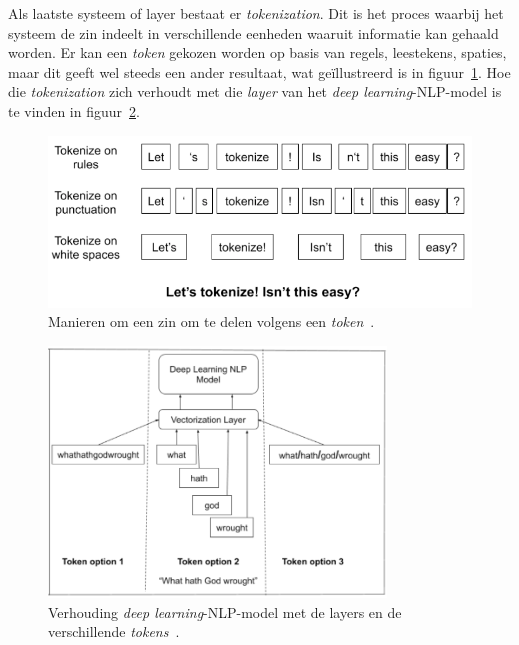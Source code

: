 Als laatste systeem of layer bestaat er \textit{tokenization}. Dit is het proces waarbij het systeem de zin indeelt in verschillende eenheden waaruit informatie kan gehaald worden.
Er kan een \textit{token} gekozen worden op basis van regels, leestekens, spaties, maar dit geeft wel steeds een ander resultaat, wat geïllustreerd is in figuur~\ref{fig:tokens}. Hoe die \textit{tokenization} zich verhoudt met die \textit{layer} van het \textit{deep learning}-NLP-model is te vinden in figuur~\ref{fig:tokens_verhouding_dl}.

\begin{figure}
    \centering
    \includegraphics[width=1\textwidth]{./img/tokenize_manier}
    \caption{\label{fig:tokens} Manieren om een zin om te delen volgens een \textit{token}~\autocite{Horan2020}.}
\end{figure}

\begin{figure}
    \centering
    \includegraphics[width=0.8\textwidth]{./img/tokenization-1}
    \caption{\label{fig:tokens_verhouding_dl}Verhouding \textit{deep learning}-NLP-model met de layers en de verschillende \textit{tokens}~\autocite{Horan2020}.}
\end{figure}


